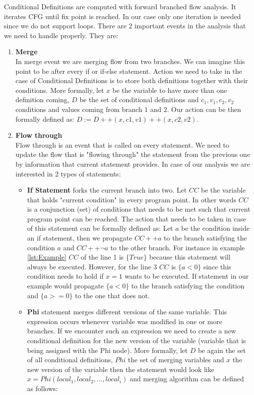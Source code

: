 \documentclass[letterpaper,12pt]{article}
\begin{document}
Conditional Definitions are computed with forward branched flow analysis. It iterates CFG until fix point is reached. In our case only one iteration is needed since we do not support loops. There are 2 important events in the analysis that we need to handle properly. They are:
\begin{enumerate}
\item \textbf{Merge} \\ 
In merge event we are merging flow from two branches. We can imagine this point to be after every if or if-else statement. Action we need to take in the case of Conditional Definitions is to store both definitions together with their conditions. More formally, let $x$ be the variable to have more than one definition coming, $D$ be the set of conditional definitions and $c_1, v_1, c_2, v_2$ conditions and values coming from branch $1$ and $2$. Our action can be then formally defined as: $D := D ++ (x, c1, v1) ++ (x, c2, v2)$.

\item \textbf{Flow through} \\
Flow through is an event that is called on every statement. We need to update the flow that is "flowing through" the statement from the previous one by information that current statement provides. In case of our analysis we are interested in 2 types of statements:

\begin{itemize}
\item \textbf{If Statement} forks the current branch into two. Let $CC$ be the variable that holds "current condition" in every program point. In other words $CC$ is a conjunction (set) of conditions that needs to be met such that current program point can be reached. The action that needs to be taken in case of this statement can be formally defined as: Let $a$ be the condition inside an if statement, then we propagate $CC ++ a$ to the branch satisfying the condition $a$ and $CC ++ \neg a$ to the other branch. For instance in example \ref{lst:Example} $CC$ of the line 1 is $\{True\}$ because this statement will always be executed. However, for the line 3 $CC$ is $\{a < 0\}$ since this condition needs to hold if $x = 1$ wants to be executed. If statement in our example would propagate $\{a < 0\}$ to the branch satisfying the condition and $\{a >= 0\}$ to the one that does not.

\item \textbf{Phi} statement merges different versions of the same variable. This expression occurs whenever variable was modified in one or more branches. If we encounter such an expression we need to create a new conditional definition for the new version of the variable (variable that is being assigned with the Phi node). More formally, let $D$ be again the set of all conditional definitions, $Phi$ the set of merging variables and $x$ the new version of the variable then the statement would look like $x = Phi(local_1, local_2, ..., local_i)$ and merging algorithm can be defined as follows:


\end{itemize}
\end{enumerate}
\end{document}
